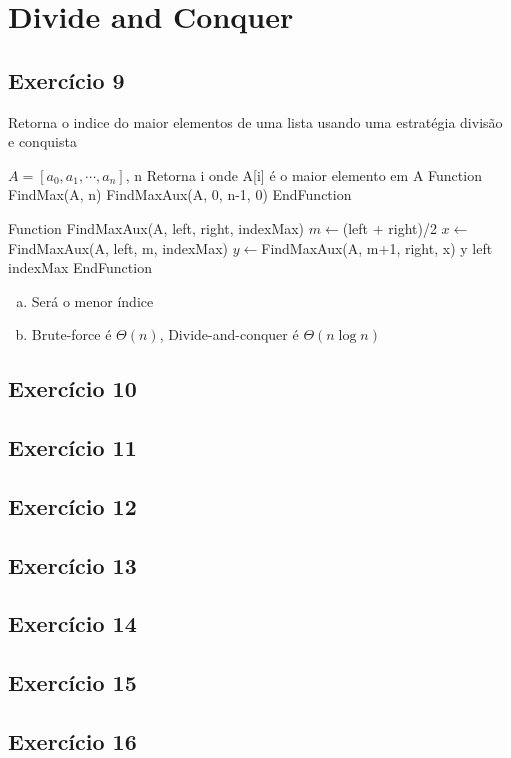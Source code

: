 \section{Divide and Conquer}\label{sec:divide_and_conquer}

\subsection{Exercício 9}\label{sec:exer9}

\begin{algorithm}
  \caption{Retorna o indice do maior elementos de uma lista usando uma estratégia divisão e conquista}
  \begin{algorithmic}
    \REQUIRE $A=[a_{0}, a_{1}, \cdots, a_{n}]$, n
    \ENSURE Retorna i onde A[i] é o maior elemento em A
    \STATE Function FindMax(A, n)
      \RETURN FindMaxAux(A, 0, n-1, 0)
    \STATE EndFunction
    
    \STATE Function FindMaxAux(A, left, right, indexMax)
        \STATE $m \leftarrow $(left + right)/2
        \STATE $x \leftarrow $FindMaxAux(A, left, m, indexMax)
        \STATE $y \leftarrow $FindMaxAux(A, m+1, right, x)
        \RETURN y
      \ELSE
          \RETURN left
        \ELSE
          \RETURN indexMax
        \ENDIF
      \ENDIF
    \STATE EndFunction
  \end{algorithmic}
\end{algorithm}

\begin{enumerate}[a)]
  \item Será o menor índice
  \item Brute-force é $\Theta(n)$, Divide-and-conquer é $\Theta(n\log{}n)$
\end{enumerate}

\subsection{Exercício 10}\label{sec:exer10}

\subsection{Exercício 11}\label{sec:exer11}

\subsection{Exercício 12}\label{sec:exer12}

\subsection{Exercício 13}\label{sec:exer13}

\subsection{Exercício 14}\label{sec:exer14}

\subsection{Exercício 15}\label{sec:exer15}

\subsection{Exercício 16}\label{sec:exer16}

